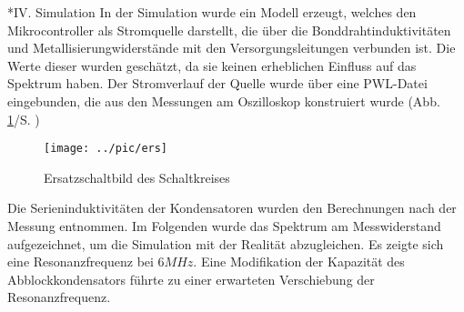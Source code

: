 \documentclass[a4paper,10pt, twocolumn]{article}
\begin{document}
\begin{section}*{IV. Simulation}
In der Simulation wurde ein Modell erzeugt, welches den Mikrocontroller als 
Stromquelle darstellt, die über die Bonddrahtinduktivitäten und 
Metallisierungwiderstände mit den Versorgungsleitungen verbunden ist. Die Werte 
dieser wurden geschätzt, da sie keinen erheblichen Einfluss auf das 
Spektrum haben. Der 
Stromverlauf der Quelle wurde über eine PWL-Datei eingebunden, die aus den 
Messungen am Oszilloskop konstruiert wurde (Abb. \ref{ers}/S. \pageref{ers})
\newline
\begin{figure}[H]
  \centering
  \texttt{[image: ../pic/ers]}
  \caption{Ersatzschaltbild des Schaltkreises}
  \label{ers}
\end{figure}
Die Serieninduktivitäten der Kondensatoren wurden den Berechnungen nach 
der Messung entnommen.
Im Folgenden wurde das Spektrum am Messwiderstand aufgezeichnet, um die 
Simulation mit der Realität abzugleichen. Es zeigte sich eine 
Resonanzfrequenz bei $6MHz$. Eine Modifikation der Kapazität des 
Abblockkondensators führte zu einer erwarteten Verschiebung der 
Resonanzfrequenz.
\end{section}
\end{document}
